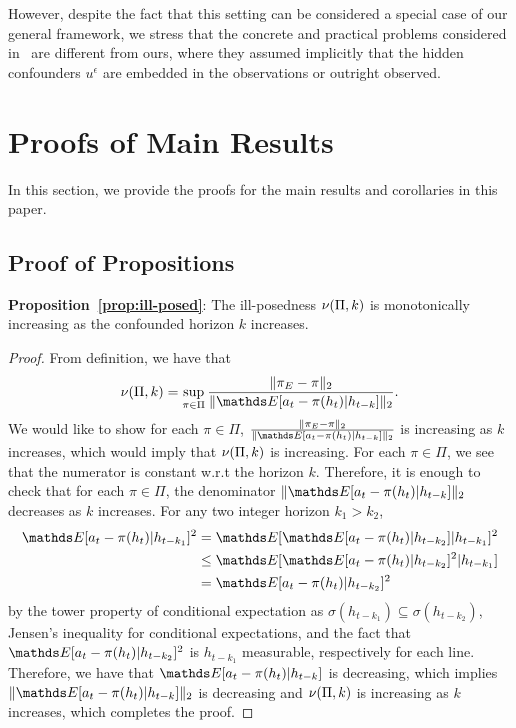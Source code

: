 However, despite the fact that this setting can be considered a special case of our general framework, we stress that the concrete and practical problems considered in~\citet{deHaan2019,Pfrommer2023,Spencer2021,Wen2020} are different from ours, where they assumed implicitly that the hidden confounders $u^\epsilon$ are embedded in the observations or outright observed.


\section{Proofs of Main Results}

In this section, we provide the proofs for the main results and corollaries in this paper.

\subsection{Proof of Propositions}\label{appendix:prop}

\textbf{Proposition~\ref{prop:ill-posed}}:
The ill-posedness $\nu(\Pi,k)$ is monotonically increasing as the confounded horizon $k$ increases.
\begin{proof}
From definition, we have that \begin{align*}
    \ill(\Pi,k)=\sup_{\pi\in\Pi} \frac{\norm{\pi_E-\pi}_{2}}{\norm{\expectE[a_t-\pi(h_t)\lvert h_{t-k}]}_{2}}.
\end{align*}
We would like to show for each $\pi\in\Pi$, $\frac{\norm{\pi_E-\pi}_{2}}{\norm{\expectE[a_t-\pi(h_t)\lvert h_{t-k}]}_{2}}$ is increasing as $k$ increases, which would imply that $\nu(\Pi,k)$ is increasing. For each $\pi\in\Pi$, we see that the numerator is constant w.r.t the horizon $k$. Therefore, it is enough to check that for each $\pi\in\Pi$, the denominator $\norm{\expectE[a_t-\pi(h_t)\lvert h_{t-k}]}_{2}$ decreases as $k$ increases. For any two integer horizon $k_1>k_2$,
\begin{align}
\expectE[a_t-\pi(h_t)\lvert h_{t-k_1}]^2&=\expectE[\expectE[a_t-\pi(h_t)\lvert h_{t-k_2}]\lvert h_{t-k_1}]^2\\
&\leq \expectE[\expectE[a_t-\pi(h_t)\lvert h_{t-k_2}]^2\lvert h_{t-k_1}]\\
&=\expectE[a_t-\pi(h_t)\lvert h_{t-k_2}]^2
\end{align}
by the tower property of conditional expectation as $\sigma(h_{t-k_1})\subseteq\sigma(h_{t-k_2})$, Jensen's inequality for conditional expectations, and the fact that $\expectE[a_t-\pi(h_t)\lvert h_{t-k_2}]^2$ is $h_{t-k_1}$ measurable, respectively for each line. Therefore, we have that $\expectE[a_t-\pi(h_t)\lvert h_{t-k}]$ is decreasing, which implies $\norm{\expectE[a_t-\pi(h_t)\lvert h_{t-k}]}_{2}$ is decreasing and $\nu(\Pi,k)$ is increasing as $k$ increases, which completes the proof.
\end{proof}

